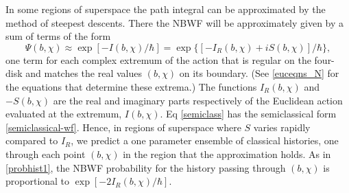\documentclass[prd,floats,superscriptaddress,eqsecnum,floatfix,nofootinbib,12pt]{revtex4}
\def\tf{}
\def\uf{}
\begin{document}
In some regions of superspace the path integral can be approximated by the method of steepest descents. There the NBWF will be approximately given by a sum of terms of the form 
\begin{equation}
\Psi(b,\chi) \approx  \exp[-I(b,\chi)/\hbar] = \exp\{[-I_R(b,\chi) +i S(b,\chi)]/\hbar\} ,
\label{semiclass}
\end{equation}
one term for each complex extremum of the action that is regular on the four-disk and matches the real values $(b,\chi)$ on its boundary.  (See \eqref{euceqns_N} for the {\uf equations} that determine these extrema.) The functions $I_R(b,\chi)$ and $-S(b,\chi)$ are the real and imaginary parts {\tf respectively}  of the Euclidean action  evaluated at the extremum, $I(b,\chi)$.  Eq \eqref{semiclass} has the semiclassical form \eqref{semiclassical-wf}. Hence, in regions of superspace where $S$ varies rapidly compared to $I_R$, we predict a one parameter ensemble of classical histories, one through each point $(b,\chi)$ in the region that  the approximation holds. As in \eqref{probhist1},  the NBWF probability for the history passing through $(b,\chi)$ is proportional to $\exp[-2I_R(b,\chi)/\hbar]$. 
\end{document}
